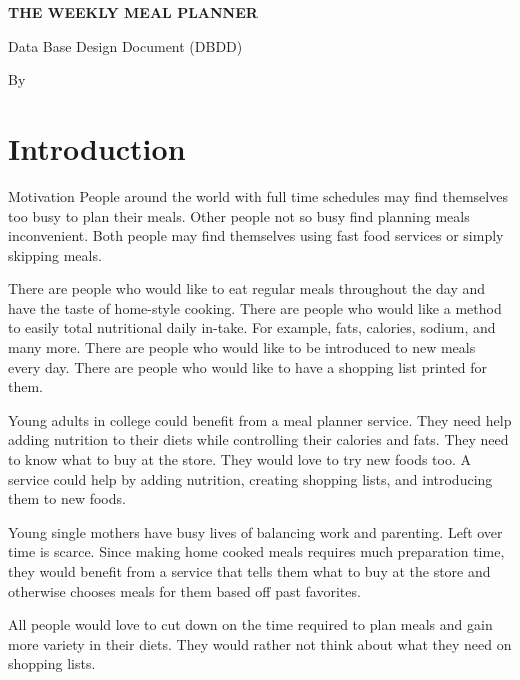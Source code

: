 \documentclass[a4paper,10pt,toc=graduated]{article}
\author{\docauthor}
\title{\doctitle}
\newcommand*\docauthor{
Josh Gillham
\\
Randy Mangel
\\
Sann Voun
\\
Daniel Eason
\\
}
\newcommand*\doctitle{The Weekly Meal Planner}
\begin{document}
\vspace*{\fill}

\begin{center}
\begin{em}
\bf
\huge
\noindent
\uppercase{
\doctitle
}

\large
Data Base Design Document (DBDD)

\end{em}
\end{center}
\vspace{\fill}

\begin{center}
\tiny
By

\begin{em}
\small
\noindent
\uppercase{
\docauthor
}
\end{em}
\end{center}
\vspace{\fill}


\newpage
\setcounter{tocdepth}{2}
\tableofcontents
\newpage
\section{Introduction}
\begin{mySubsection}{Motivation}
People around the world with full time schedules may find themselves too busy
to plan their meals.
Other people not so busy find planning meals inconvenient.
Both people may find themselves using fast food services
or simply skipping meals.

There are people who would like to eat regular meals throughout the day
and have the taste of home-style cooking.
There are people who would like a method to easily total nutritional daily in-take.
For example, fats, calories, sodium, and many more.
There are people who would like to be introduced to new meals every day.
There are people who would like to have a shopping list printed for them.

Young adults in college could benefit from a meal planner service.
They need help adding nutrition to their diets
while controlling their calories and fats.
They need to know what to buy at the store.
They would love to try new foods too.
A service could help by
adding nutrition,
creating shopping lists,
and introducing them to new foods.

Young single mothers have busy lives of balancing work and parenting.
Left over time is scarce.
Since making home cooked meals requires much preparation time,
they would benefit from a service
that tells them what to buy at the store
and otherwise chooses meals for them based off past favorites.

All people would love to cut down on the time required to plan meals
and gain more variety in their diets.
They would rather not think about what they need on shopping lists.
\end{mySubsection}
\end{document}
